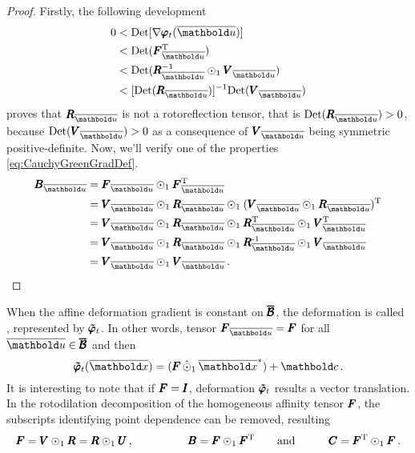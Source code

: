 {\footnotesize
\begin{proof}
Firstly, the following development 
\begin{align*}
0&<\textnormal{Det}[\fua{\nabla\tnr{\varphi}_t}{\overline{\vto{u}}}]\\ 
&< \textnormal{Det}(\tnr{F}_{\overline{\vto{u}}}^\text{T})\\
&< \textnormal{Det}(\tnr{R}_{\overline{\vto{u}}}^{-1}\odot_1\tnr{V}_{\overline{\vto{u}}})\\
&< [\textnormal{Det}(\tnr{R}_{\overline{\vto{u}}})]^{-1}\textnormal{Det}(\tnr{V}_{\overline{\vto{u}}})
\end{align*}
proves that $\tnr{R}_{\overline{\vto{u}}}$ is not a rotoreflection tensor, that is $\textnormal{Det}(\tnr{R}_{\overline{\vto{u}}})>0$, because $\textnormal{Det}(\tnr{V}_{\overline{\vto{u}}})>0$ as a consequence of $\tnr{V}_{\overline{\vto{u}}}$ being symmetric positive-definite. Now, we'll verify one of the properties \eqref{eq:CauchyGreenGradDef}. 
\begin{align*}
\tnr{B}_{\overline{\vto{u}}}&=\tnr{F}_{\overline{\vto{u}}}\odot_1\tnr{F}_{\overline{\vto{u}}}^\text{T}\\
&=\tnr{V}_{\overline{\vto{u}}}\odot_1\tnr{R}_{\overline{\vto{u}}}\odot_1(\tnr{V}_{\overline{\vto{u}}}\odot_1\tnr{R}_{\overline{\vto{u}}})^\text{T}\\
&=\tnr{V}_{\overline{\vto{u}}}\odot_1\tnr{R}_{\overline{\vto{u}}}\odot_1\tnr{R}_{\overline{\vto{u}}}^\text{T}\odot_1\tnr{V}_{\overline{\vto{u}}}^\text{T}\\
&=\tnr{V}_{\overline{\vto{u}}}\odot_1\tnr{R}_{\overline{\vto{u}}}\odot_1\tnr{R}_{\overline{\vto{u}}}^\text{-1}\odot_1\tnr{V}_{\overline{\vto{u}}}\\
&=\tnr{V}_{\overline{\vto{u}}}\odot_1\tnr{V}_{\overline{\vto{u}}}\,.
\end{align*}
\end{proof}
}

\noindent When the affine deformation gradient is constant on $\pmb{\overline{\mathcal{B}}}$, the deformation is called , represented by $\pmb{\tilde{\varphi}}_t$. In other words, tensor $\tnr{F}_{\overline{\vto{u}}}=\tnr{F}$ for all $\overline{\vto{u}}\in\tnr{\overline{\mathcal{B}}}$ and then 
\begin{equation}\label{eq:homogDef}
\fua{\tnr{\tilde{\varphi}}_t}{\overline{\vto{x}}} =(\tnr{F}\,\hat{\odot}_1\,\overline{\vto{x}}^*) + \vto{c}\,.
\end{equation}
It is interesting to note that if $\pmb{F}=\pmb{I}$, deformation $\pmb{\tilde{\varphi}}_t$ results a vector translation. In the rotodilation decomposition of the homogeneous affinity tensor $\pmb{F}$, the subscripts identifying point dependence can be removed, resulting  
\begin{alignat}{3}
\pmb{F}=\pmb{V}\odot_1\pmb{R}=\pmb{R}\odot_1\pmb{U}\,,&\qquad \qquad &\pmb{B}=\pmb{F}\odot_1\pmb{F}^\text{T}&\qquad \text{and}\qquad & \pmb{C}=\pmb{F}^\text{T}\odot_1\pmb{F}\,.
\end{alignat}

